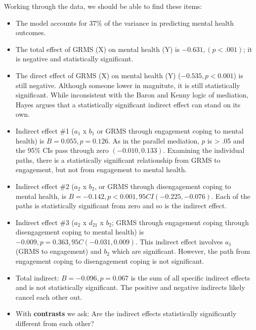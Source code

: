 \documentclass[
  11pt,
]{book}
\providecommand{\tightlist}{%
  \setlength{\itemsep}{0pt}\setlength{\parskip}{0pt}}
\begin{document}
Working through the data, we should be able to find these items:

\begin{itemize}
\tightlist
\item
  The model accounts for 37\% of the variance in predicting mental health outcomes.
\item
  The total effect of GRMS (X) on mental health (Y) is \(-0.631, (p < .001)\); it is negative and statistically significant.
\item
  The direct effect of GRMS (X) on mental health (Y) (\(-0.535, p < 0.001\)) is still negative. Although someone lower in magnitute, it is still statistically significant. While inconsistent with the Baron and Kenny \citeyearpar{baron_moderator-mediator_1986} logic of mediation, Hayes \citep{hayes_more_2022} argues that a statistically significant indirect effect can stand on its own.
\item
  Indirect effect \#1 (\(a_{1}\) x \(b_{1}\) or GRMS through engagement coping to mental health) is \(B = 0.055, p =0.126\). As in the parallel mediation, \(p\) is \textgreater{} .05 and the 95\% CIs pass through zero \((-0.010, 0.133 )\). Examining the individual paths, there is a statistically significant relationship from GRMS to engagement, but not from engagement to mental health.
\item
  Indirect effect \#2 (\(a_{2}\) x \(b_{2}\), or GRMS through disengagement coping to mental health, is \(B = -0.142, p < 0.001, 95CI (-0.225, -0.076)\). Each of the paths is statistically significant from zero and so is the indirect effect.
\item
  Indirect effect \#3 (\(a_{2}\) x \(d_{21}\) x \(b_{2}\); GRMS through engagement coping through disengagement coping to mental health) is \(-0.009, p = 0.363, 95C (-0.031, 0.009)\). This indirect effect involves \(a_{1}\) (GRMS to engagement) and \(b_{2}\) which are significant. However, the path from engagement coping to disengagement coping is not significant.
\item
  Total indirect: \(B = -0.096, p = 0.067\) is the sum of all specific indirect effects and is not statistically significant. The positive and negative indirects likely cancel each other out.
\item
  With \textbf{contrasts} we ask: Are the indirect effects statistically significantly different from each other?


\end{itemize}
\end{document}
